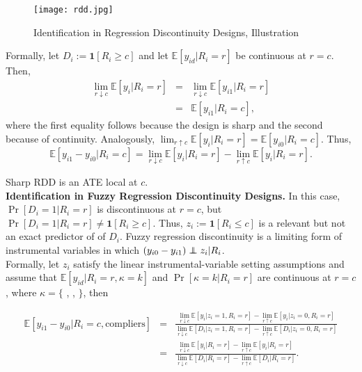 \begin{figure}[H]
\centering
\caption{Identification in Regression Discontinuity Designs, Illustration}
\texttt{[image: rdd.jpg]}
\end{figure}

\noindent Formally, let $D_{i} := \bm{1} \left[ R_{i} \geq c \right]$ and let $\mathbb{E} \left[ y_{id} | R_{i} = r\right]$ be continuous at $r = c$. Then, 
\begin{eqnarray} 
\lim_{r \downarrow c} \mathbb{E} \left[ y_{i} | R_{i} = r \right] &=& \lim_{r \downarrow c}  \mathbb{E} \left[ y_{i1} | R_{i} = r \right] \nonumber \\
&=& \mathbb{E} \left[ y_{i1} | R_{i} = c \right], 
\end{eqnarray}
\noindent where the first equality follows because the design is sharp and the second because of continuity. Analogously, $\lim_{r \uparrow c} \mathbb{E} \left[ y_{i} | R_{i} = r \right] =  \mathbb{E} \left[ y_{i0} | R_{i} = c \right]$. Thus, 
\begin{equation}
\mathbb{E} \left[ y_{i1} - y_{i0} | R_{i} = c \right] = \lim_{r \downarrow c} \mathbb{E} \left[ y_{i} | R_{i} = r \right] - \lim_{r \uparrow c} \mathbb{E} \left[ y_{i} | R_{i} = r \right].
\end{equation}

\noindent Sharp RDD is an ATE local at $c$.\\

\noindent \textbf{Identification in Fuzzy Regression Discontinuity Designs.} In this case, $\Pr \left[ D_{i} = 1 | R_i = r \right]$ is discontinuous at $r = c$, but $\Pr \left[ D_{i} = 1 | R_i = r \right] \neq \bm{1} \left[ R_i \geq c \right]$. Thus, $ z_{i}:= \bm{1} \left[ R_i \leq c \right]$ is a relevant but not an exact predictor of  of $D_{i}$. Fuzzy regression discontinuity is a limiting form of instrumental variables in which $\left( y_{i0} - y_{i1} \right) \independent z_{i} | R_{i}$.\\

\noindent Formally, let $z_{i}$ satisfy the linear instrumental-variable setting assumptions and assume that $\mathbb{E} \left[ y_{id} | R_i = r, \kappa = k \right]$ and $\Pr \left[ \kappa = k | R_i = r \right]$ are continuous at $r = c$, where $\kappa = \{$ , ,  $\}$, then

\begin{eqnarray}
\mathbb{E} \left[ y_{i1} - y_{i0} | R_i = c, \text{compliers} \right] &=& 
\frac{  \lim_{r \downarrow c} \mathbb{E} \left[ y_{i} | z_{i} = 1, R_{i} = r  \right] - \lim_{r \uparrow c} \mathbb{E} \left[ y_{i} | z_{i} = 0, R_{i} = r  \right] } {  \lim_{r \downarrow c} \mathbb{E} \left[ D_{i} | z_{i} = 1, R_{i} = r  \right] - \lim_{r \uparrow c} \mathbb{E} \left[ D_{i} | z_{i} = 0, R_{i} = r  \right] } \nonumber \\
&=&\frac{  \lim_{r \downarrow c} \mathbb{E} \left[ y_{i} | R_{i} = r  \right] - \lim_{r \uparrow c} \mathbb{E} \left[ y_{i} | R_{i} = r  \right] } {  \lim_{r \downarrow c} \mathbb{E} \left[ D_{i} | R_{i} = r  \right] - \lim_{r \uparrow c} \mathbb{E} \left[ D_{i} | R_{i} = r  \right] }.
\end{eqnarray}

